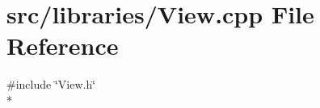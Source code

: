 \section{src/libraries/\-View.cpp File Reference}
\label{_view_8cpp}
{\ttfamily \#include \char`\"{}View.\-h\char`\"{}}\\*
